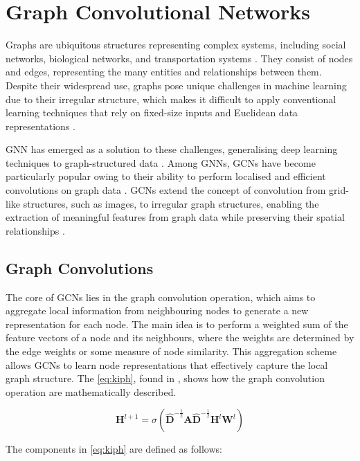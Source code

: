 \section{Graph Convolutional Networks}
Graphs are ubiquitous structures representing complex systems, including social networks, biological networks, and transportation systems \autocite{scarselli2008graph}. They consist of nodes and edges, representing the many entities and relationships between them. Despite their widespread use, graphs pose unique challenges in machine learning due to their irregular structure, which makes it difficult to apply conventional learning techniques that rely on fixed-size inputs and Euclidean data representations \autocite{battaglia2018relational}.

\Gls{GNN} has emerged as a solution to these challenges, generalising deep learning techniques to graph-structured data \autocite{gori2005new}. Among \glspl{GNN}, \glspl{GCN} have become particularly popular owing to their ability to perform localised and efficient convolutions on graph data \autocite{DBLP:journals/corr/KipfW16}. \glspl{GCN} extend the concept of convolution from grid-like structures, such as images, to irregular graph structures, enabling the extraction of meaningful features from graph data while preserving their spatial relationships \autocite{bronstein2017geometric}. 

\subsection{Graph Convolutions}
The core of \glspl{GCN} lies in the graph convolution operation, which aims to aggregate local information from neighbouring nodes to generate a new representation for each node. The main idea is to perform a weighted sum of the feature vectors of a node and its neighbours, where the weights are determined by the edge weights or some measure of node similarity. This aggregation scheme allows \glspl{GCN} to learn node representations that effectively capture the local graph structure. The \cref{eq:kiph}, found in \autocite{DBLP:journals/corr/KipfW16}, shows how the graph convolution operation are mathematically described.

\begin{equation*} 
    \bm{H}^{l+1} = \sigma(\bm{\hat{D}}^{-\frac{1}{2}} \bm{A} \bm{\hat{D}}^{-\frac{1}{2}} \bm{H}^{l} \bm{W}^{l} )
    \label{eq:kiph}
\end{equation*}


The components in \cref{eq:kiph} are defined as follows:

